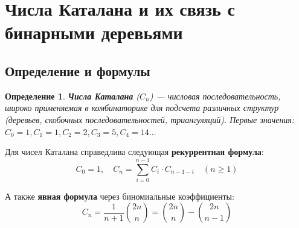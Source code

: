 \documentclass[12pt, a4paper]{article}
\newtheorem{definition}{Определение}
\begin{document}
\section{Числа Каталана и их связь с бинарными деревьями}

\subsection{Определение и формулы}
\begin{definition}
\textbf{Числа Каталана} ($C_n$) --- числовая последовательность, широко применяемая в комбинаторике для подсчета различных структур (деревьев, скобочных последовательностей, триангуляций). Первые значения: $C_0=1, C_1=1, C_2=2, C_3=5, C_4=14 \dots$
\end{definition}

Для чисел Каталана справедлива следующая \textbf{рекуррентная формула}:
\begin{equation}
C_0 = 1, \quad C_n = \sum_{i=0}^{n-1} C_i \cdot C_{n-1-i} \quad (n \ge 1)
\end{equation}

А также \textbf{явная формула} через биномиальные коэффициенты:
\begin{equation}
C_n = \frac{1}{n+1} \binom{2n}{n} = \binom{2n}{n} - \binom{2n}{n-1}
\end{equation}
\end{document}
